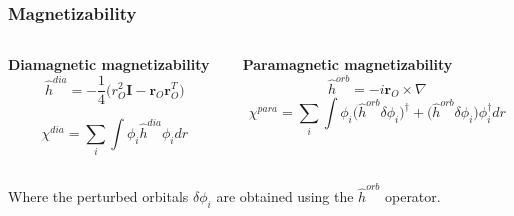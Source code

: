 \begin{frame}
\frametitle{Magnetizability}
\begin{columns}

\begin{column}[b]{0.5\textwidth}
\centering
\textbf{Diamagnetic magnetizability}
\begin{equation}
    \nonumber
    \hat{h}^{dia} = -\frac{1}{4}\Big(r_O^2\boldsymbol{I} - 
    \boldsymbol{r}_O\boldsymbol{r}_O^T\Big)
\end{equation}

\vspace{2mm}

\begin{equation}
    \nonumber
    \chi^{dia} = \sum_i \int \phi_i \hat{h}^{dia} \phi_i dr
\end{equation}
\end{column}

\begin{column}[b]{0.5\textwidth}
\centering
\textbf{Paramagnetic magnetizability}
\begin{equation}
    \nonumber
    \hat{h}^{orb} = -i \boldsymbol{r}_O\times\nabla
\end{equation}
\vspace{2mm}
\begin{equation}
    \nonumber
    \chi^{para} = \sum_i \int \phi_i \Big(\hat{h}^{orb} \delta\phi_i\Big)^\dag + 
    \Big(\hat{h}^{orb}\delta\phi_i\Big)\phi_i^\dag dr
\end{equation}
\end{column}

\end{columns}
\vspace{5mm}
\centering
Where the perturbed orbitals $\delta\phi_i$ are obtained using 
the $\hat{h}^{orb}$ operator.
\vspace{5mm}


\end{frame}
